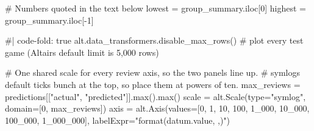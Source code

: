 \documentclass[
  letterpaper,
  DIV=11,
  numbers=noendperiod]{scrartcl}
\newenvironment{Shaded}{\begin{snugshade}}{\end{snugshade}}
\newcommand{\BuiltInTok}[1]{\textcolor[rgb]{0.00,0.23,0.31}{#1}}
\newcommand{\CommentTok}[1]{\textcolor[rgb]{0.37,0.37,0.37}{#1}}
\newcommand{\DecValTok}[1]{\textcolor[rgb]{0.68,0.00,0.00}{#1}}
\newcommand{\NormalTok}[1]{\textcolor[rgb]{0.00,0.23,0.31}{#1}}
\newcommand{\OperatorTok}[1]{\textcolor[rgb]{0.37,0.37,0.37}{#1}}
\newcommand{\StringTok}[1]{\textcolor[rgb]{0.13,0.47,0.30}{#1}}
\begin{document}
\begin{Shaded}
\begin{Highlighting}[]
\CommentTok{\# Numbers quoted in the text below}
\NormalTok{lowest }\OperatorTok{=}\NormalTok{ group\_summary.iloc[}\DecValTok{0}\NormalTok{]}
\NormalTok{highest }\OperatorTok{=}\NormalTok{ group\_summary.iloc[}\OperatorTok{{-}}\DecValTok{1}\NormalTok{]}

\CommentTok{\#| code{-}fold: true}
\NormalTok{alt.data\_transformers.disable\_max\_rows()  }\CommentTok{\# plot every test game (Altair\textquotesingle{}s default limit is 5,000 rows)}

\CommentTok{\# One shared scale for every review axis, so the two panels line up.}
\CommentTok{\# symlog\textquotesingle{}s default ticks bunch at the top, so place them at powers of ten.}
\NormalTok{max\_reviews }\OperatorTok{=}\NormalTok{ predictions[[}\StringTok{"actual"}\NormalTok{, }\StringTok{"predicted"}\NormalTok{]].}\BuiltInTok{max}\NormalTok{().}\BuiltInTok{max}\NormalTok{()}
\NormalTok{scale }\OperatorTok{=}\NormalTok{ alt.Scale(}\BuiltInTok{type}\OperatorTok{=}\StringTok{"symlog"}\NormalTok{, domain}\OperatorTok{=}\NormalTok{[}\DecValTok{0}\NormalTok{, max\_reviews])}
\NormalTok{axis }\OperatorTok{=}\NormalTok{ alt.Axis(values}\OperatorTok{=}\NormalTok{[}\DecValTok{0}\NormalTok{, }\DecValTok{1}\NormalTok{, }\DecValTok{10}\NormalTok{, }\DecValTok{100}\NormalTok{, }\DecValTok{1\_000}\NormalTok{, }\DecValTok{10\_000}\NormalTok{, }\DecValTok{100\_000}\NormalTok{, }\DecValTok{1\_000\_000}\NormalTok{],}
\NormalTok{                labelExpr}\OperatorTok{=}\StringTok{"format(datum.value, \textquotesingle{},\textquotesingle{})"}\NormalTok{)}


\end{Highlighting}
\end{Shaded}
\end{document}
